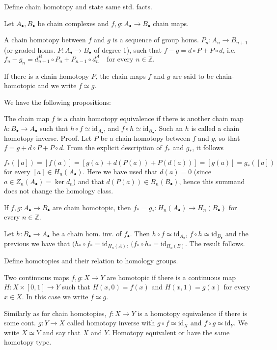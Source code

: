 Define chain homotopy and state same std. facts.

Let \( A_\bullet, B_\bullet \) be chain complexes and \( f,g : A_\bullet \to B_\bullet \) chain maps.

A chain homotopy between \( f \) and \( g \) is a sequence of group homs. \( P_n : A_n \to B_{n+1} \)
(or graded homs. \( P : A_\bullet \to B_\bullet \) of degree 1),
such that \(f - g = d \circ P + P \circ d\), i.e. 
\(f_n - g_n = d^B_{n+1} \circ P_n + P_{n-1} \circ d^A_n \quad \text{for every } n \in \mathbb{Z}.\)

If there is a chain homotopy \(P\), the chain maps \(f\) and \(g\) are said to be chain-homotopic and we write \(f \simeq g\).

We have the following propositions:

The chain map \(f\) is a chain homotopy equivalence if there is another chain map \(h: B_\bullet \to A_\bullet\) such that \(h \circ f \simeq \text{id}_{A_\bullet}\), 
and \(f \circ h \simeq \text{id}_{B_\bullet}\). Such an \(h\) is called a chain homotopy inverse.
Proof. 
Let \(P\) be a chain-homotopy between \(f\) and \(g\), so that \(f = g + d \circ P + P \circ d\). From the explicit description of \(f_*\) and \(g_*\), it follows

\(f_*([a]) = [f(a)] = [g(a) + d(P(a)) + P(d(a))] = [g(a)] = g_*([a])\)
for every \([a] \in H_n(A_\bullet)\). Here we have used that \(d(a) = 0\) (since \(a \in Z_n(A_\bullet) = \ker d_n\)) and that \(d(P(a)) \in B_n(B_\bullet)\), hence this summand does not change the homology class.

If \( f, g : A_\bullet \to B_\bullet \) are chain homotopic, then \( f_{\ast} = g_{\ast} : H_n(A_\bullet) \to H_n(B_{\bullet})\)
for every \( n \in \mathbb{Z} \).

Let \( h : B_\bullet \to A_\bullet \) be a chain hom. inv. of \( f_{\bullet} \). Then \( h \circ f \simeq \text{id}_{A_{\bullet}} \), \( f \circ h \simeq \text{id}_{B_{\bullet}} \) and the previous we have that \( (h_\ast \circ f_{\ast} = \text{id}_{H_n(A)} \), \( (f_\ast \circ h_{\ast} = \text{id}_{H_n(B)} \). The result follows.


Define homotopies and their relation to homology groups.

Two continuous maps \( f, g : X \to Y \) are homotopic if there is a continuous map
\( H : X \times [0, 1] \to Y \) such that \( H(x, 0) = f(x) \) and \(H(x, 1) = g(x)\) for every \( x \in X \). 
In this case we write \( f \simeq g \).

Similarly as for chain homotopies, \( f : X \to Y \) is a homotopy equivalence if there is some cont. \( g : Y \to X \)
called homotopy inverse with \( g \circ f \simeq \text{id}_X \) and \( f \circ g \simeq \text{id}_{Y} \).
We write \( X \simeq Y \) and say that \( X \) and \( Y \). Homotopy equivalent or have the
same homotopy type.

